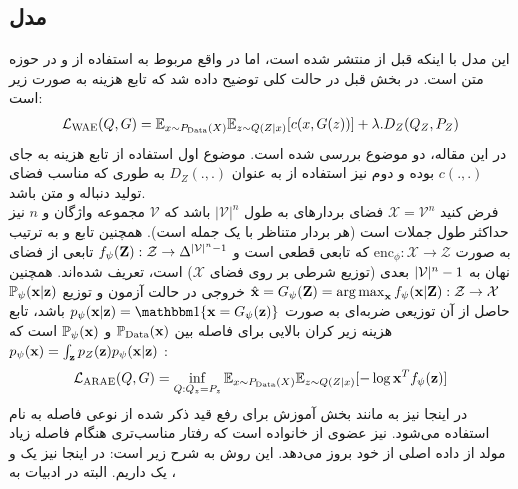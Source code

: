 \subsection{مدل 
    }
این مدل با اینکه قبل از \wae{} منتشر شده است، اما در واقع مربوط به استفاده از \wgan{} و \wae{} در حوزه متن است. در بخش قبل در حالت کلی توضیح داده شد که تابع هزینه \wae{} به صورت زیر است:
\begin{align}
    \mathcal{L}_{\text{WAE}}(Q, G) = \mathbb E_{x \sim P_{\text{Data}}(X)}\mathbb E_{z \sim Q(Z|x)} [c(x, G(z))] + \lambda . D_ Z(Q_Z, P_Z)
\end{align}
در این مقاله، دو موضوع بررسی شده است. موضوع اول استفاده از تابع هزینه \crossentropy{} به جای $c(.,.)$ بوده و دوم نیز استفاده از \wgan{} به عنوان $D_Z(.,.)$ به طوری که مناسب فضای تولید دنباله و متن باشد.
\\
فرض کنید $\mathcal{X} = \mathcal{V}^n$ فضای بردارهای
به طول $|\mathcal{V}|^n$ باشد که $\mathcal{V}$ مجموعه واژگان و $n$ نیز حداکثر طول جملات است (هر بردار متناظر با یک جمله است). همچنین تابع \encoder{} و \decoder{} به ترتیب به صورت
$\text{enc}_\phi: \mathcal{X} \rightarrow \mathcal{Z}$ 
که تابعی قطعی است و $f_\psi({\bf Z}) : {\mathcal{Z}} \rightarrow \Delta^{|{\mathcal{V}}|^n - 1}$ تابعی از فضای نهان به 
 $|{\mathcal{V}}|^n - 1$
بعدی (توزیع شرطی بر روی فضای $\mathcal{X}$) است، تعریف شده‌اند. همچنین 
    $\hat{{\bf x}} = G_\psi({\bf Z})  = \operatorname*{arg\,max}_{
        {\bf x}} f_\psi({\bf x}|{\bf Z}) : {\mathcal{Z}} \rightarrow {\mathcal{X}}$
    خروجی \decoder{} در حالت آزمون و توزیع ${\mathbb{P}}_\psi({\bf x}|{\bf z})$ حاصل از آن توزیعی ضربه‌ای به صورت 
    $p_\psi(\bff{x}|\bff{z}) = \bbm{1}\{\bff{x} = G_\psi(\bff{z})\}$
    باشد، تابع هزینه زیر کران بالایی برای فاصله \wasser{} بین ${\mathbb{P}}_\text{Data}({\bf x})$ و ${\mathbb{P}}_\psi({\bf x})$ است که  
    $p_\psi({\bf x}) = \int_{\bf z} p_Z({\bf z})p_\psi({\bf x}|{\bf z})$
    :
    \begin{align}
    \mathcal{L}_{\text{ARAE}}(Q, G) = \inf_{Q: Q_z = P_z} \mathbb E_{x \sim P_{\text{Data}}(X)}\mathbb E_{z \sim Q(Z|x)} [-\log {\bf x}^T f_\psi({\bf z})]
    \end{align}
در اینجا نیز به مانند بخش آموزش  \wae{} برای رفع قید ذکر شده از نوعی فاصله به نام \wgan{} استفاده می‌شود. \wgan{} نیز عضوی از خانواده \gan{} است که رفتار مناسب‌تری هنگام فاصله زیاد مولد از داده اصلی از خود بروز می‌دهد. این روش به شرح زیر است:
در اینجا نیز یک \generator{} و یک \discriminator{} داریم. البته در ادبیات \wgan{} به \discriminator{}، 
